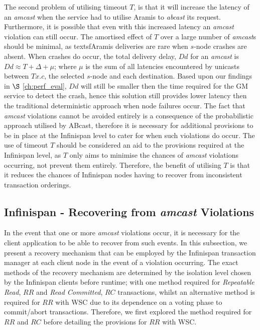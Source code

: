     The second problem of utilising timeout $T$, is that it will increase the latency of an \emph{amcast} when the service had to utilise \textsf{Aramis} to \emph{abcast} its request.  Furthermore, it is possible that even with this increased latency an \emph{amcast} violation can still occur.  The amortised effect of $T$ over a large number of \emph{amcast}s should be minimal, as textsf{Aramis} deliveries are rare when $s$-node crashes are absent.  When crashes do occur, the total delivery delay, $Dd$ for an \emph{amcast} is $Dd \approx T + \Delta + \mu$; where $\mu$ is the sum of all latencies encountered by unicasts between $Tx.c$, the selected $s$-node and each destination.  Based upon our findings in $\S$ \ref{ch:perf_eval}, $Dd$ will still be smaller then the time required for the GM service to detect the crash, hence this solution still provides lower latency then the traditional deterministic approach when node failures occur.  The fact that \emph{amcast} violations cannot be avoided entirely is a consequence of the probabilistic approach utilised by \textsf{ABcast}, therefore it is necessary for additional provisions to be in place at the Infinispan level to cater for when such violations do occur.  The use of timeout $T$ should be considered an aid to the provisions required at the Infinispan level, as $T$ only aims to minimise the chances of \emph{amcast} violations occurring, not prevent them entirely.  Therefore, the benefit of utilising $T$ is that it reduces the chances of Infinispan nodes having to recover from inconsistent transaction orderings.  
    
    \subsection{Infinispan - Recovering from \emph{amcast} Violations}
    In the event that one or more \emph{amcast} violations occur, it is necessary for the client application to be able to recover from such events.  In this subsection, we present a recovery mechanism that can be employed by the Infinispan transaction manager at each client node in the event of a violation occurring.  The exact methods of the recovery mechanism are determined by the isolation level chosen by the Infinispan clients before runtime; with one method required for \emph{Repeatable Read}, $RR$ and \emph{Read Committed}, $RC$ transactions, whilst an alternative method is required for $RR$ with WSC due to its dependence on a voting phase to commit/abort transactions.  Therefore, we first explored the method required for $RR$ and $RC$ before detailing the provisions for $RR$ with WSC.  
    
